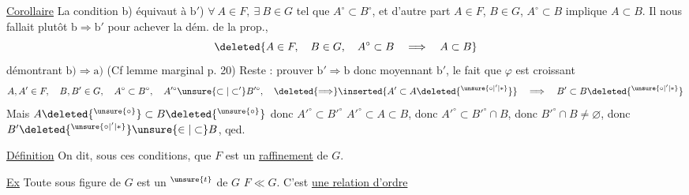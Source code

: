 \uline{Corollaire} La condition b) équivaut à
$\mathrm{b}'$) $\forall\ A\in F,\ \exists\ B\in G$ tel que $A^\circ\subset B^\circ$, et d'autre part $A\in F$, $B\in G$, $A^\circ\subset B$ implique $A\subset B$.
Il nous fallait plutôt $\mathrm b\Rightarrow\mathrm b'$ pour achever la dém. de la prop.,    
\[ \deleted{A\in F,\quad B\in G,\quad A^\circ\subset B\quad\Longrightarrow\quad A\subset B} \]
   démontrant $\mathrm b)\Rightarrow\mathrm a)$ (Cf lemme marginal p. 20) Reste : prouver $\mathrm b'\Rightarrow\mathrm b$ donc moyennant $\mathrm{b}'$, le fait que $\varphi$ est croissant
\[ A,A'\in F,\quad B,B'\in G,\quad A^\circ\subset B^\circ,\quad A'^\circ\unsure{\subset|\subset'}B'^\circ,\quad \deleted{\Longrightarrow}\inserted{A'\subset A\deleted{{}^{\unsure{\circ|'|*}}}}\quad\Longrightarrow\quad B'\subset B\deleted{{}^{\unsure{\circ|'|*}}} \]
Mais      $A\deleted{{}^{\unsure{\circ}}}\subset B\deleted{{}^{\unsure{\circ}}}$   donc $A'^\circ\subset B'^\circ$ 
$A'^\circ\subset A\subset B$, donc $A'^\circ\subset B'^\circ\cap B$, donc $B'^\circ\cap B\ne\varnothing$, donc $B'\deleted{{}^{\unsure{\circ|'|*}}}\unsure{\in|\subset}B$, qed.

\uline{Définition} On dit, sous ces conditions, que $F$ est un \uline{raffinement} de $G$.

\uline{Ex} Toute sous figure de $G$ est un $^{\unsure{t}}$ de $G$
 $F\ll G$. C'est \uline{une relation d'ordre}

